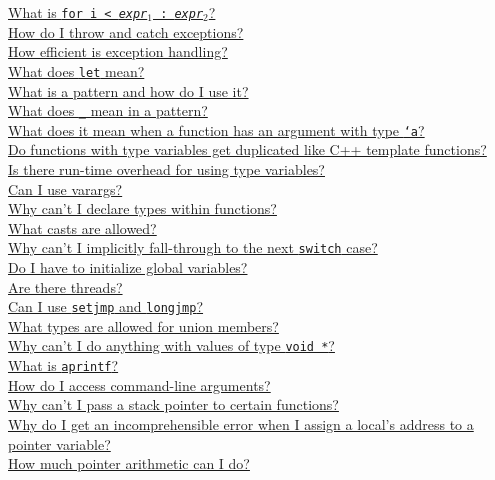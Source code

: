 \begin{small}
\hyperlink{faq:arrayinit}{What is \texttt{\lb for i < {\it expr}$_1$ : {\it expr}$_2$\rb}?}\\
\hyperlink{faq:exns}{How do I throw and catch exceptions?}\\
\hyperlink{faq:exn-efficiency}{How efficient is exception handling?}\\
\hyperlink{faq:let}{What does \texttt{let} mean?}\\
\hyperlink{faq:pattern}{What is a pattern and how do I use it?}\\
\hyperlink{faq:uscore-pattern}{What does \texttt{_} mean in a pattern?}\\
\hyperlink{faq:polymorphic}{What does it mean when a function has an argument with type \texttt{`a}?}\\
\hyperlink{faq:templates}{Do functions with type variables get duplicated like C++ template functions?\\  Is there run-time overhead for using type variables?}\\
\hyperlink{faq:vararg}{Can I use varargs?}\\
\hyperlink{faq:typesinfunctions}{Why can't I declare types within functions?}\\
\hyperlink{faq:casts}{What casts are allowed?}\\
\hyperlink{faq:implicitfallthru}{Why can't I implicitly fall-through to the next \texttt{switch} case?}\\
\hyperlink{faq:globalinit}{Do I have to initialize global variables?}\\
\hyperlink{faq:threads}{Are there threads?}\\
\hyperlink{faq:setjmp}{Can I use \texttt{setjmp} and \texttt{longjmp}?}\\
\hyperlink{faq:uniontypes}{What types are allowed for union members?}\\
\hyperlink{faq:voidstar2}{Why can't I do anything with values of type \texttt{void *}?}\\
\hyperlink{faq:aprintf}{What is \texttt{aprintf}?}\\
\hyperlink{faq:commandline}{How do I access command-line arguments?}\\
\hyperlink{faq:stackpointer}{Why can't I pass a stack pointer to certain functions?}\\
\hyperlink{faq:localaddress}{Why do I get an incomprehensible error when I assign a local's address to a pointer variable?}\\
\hyperlink{faq:pointerarith}{How much pointer arithmetic can I do?}\\

\end{small}
